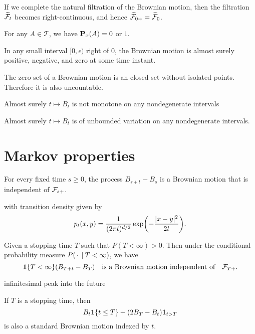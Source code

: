 If we complete the natural filtration of the Brownian motion, then the filtration $\widetilde{\mathcal{F}}_t$ becomes right-continuous, and hence $\widetilde{\mathcal{F}}_{0+} = \widetilde{\mathcal{F}}_0$.
    
\begin{thm}
    For any $A \in \mathcal T $, we have $\mathbf{P}_x(A) = 0$ or $1$.
\end{thm}

\begin{thm}
    
\end{thm}

In any small interval $[0,\epsilon)$ right of $0$, the Brownian motion is almost surely positive, negative, and zero at some time instant.

The zero set of a Brownian motion is an closed set without isolated points. Therefore it is also uncountable.

Almost surely $t\mapsto B_t$ is not monotone on any nondegenerate intervals

Almost surely $t\mapsto B_t$ is of unbounded variation on any nondegenerate intervals.

\section{Markov properties}

\begin{namedthm}
    For every fixed time $s \geq 0$, the process $B_{s+t} - B_s$ is a Brownian motion that is independent of $\mathcal{F}_{s+}$.
\end{namedthm}

with transition density given by \[
    p_t(x,y) = \frac{1}{(2\pi t)^{d/2}} \exp\biggl(-\frac{\lvert x - y \rvert^2}{2t}\biggr).
\]

\begin{namedthm}
    Given a stopping time $T$ such that $P(T < \infty) >0$. Then under the conditional probability measure $P(\,\cdot\, \mathbin{|} T < \infty)$, we have \[\mathbf{1}\{T < \infty\} (B_{T+t} - B_T) \quad\text{is a Brownian motion independent of}\quad \mathcal{F}_{T+}.\]
\end{namedthm}

infinitesimal peak into the future

\begin{prop}
    If $T$ is a stopping time, then \[
    B_t \mathbf{1}\{t \leq T\} + (2B_T - B_t) \mathbf{1}_{t > T}
\] is also a standard Brownian motion indexed by $t$.
\end{prop}


